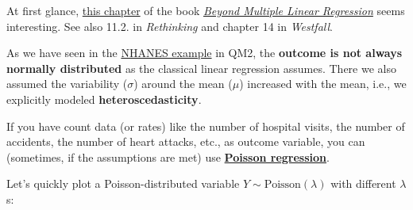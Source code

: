 \documentclass[
]{book}
\begin{document}
At first glance, \href{https://bookdown.org/roback/bookdown-BeyondMLR/ch-poissonreg.html}{this chapter}
of the book \href{https://bookdown.org/roback/bookdown-BeyondMLR/}{\emph{Beyond Multiple Linear Regression}} seems interesting.
See also 11.2. in \emph{Rethinking} and chapter 14 in \emph{Westfall}.

As we have seen in the \href{https://ec.europa.eu/info/funding-tenders/opportunities/portal/screen/opportunities/calls-for-proposals?isExactMatch=true&status=31094501,31094502,31094503&order=DESC&pageNumber=1&pageSize=50&sortBy=startDate}{NHANES example}
in QM2, the \textbf{outcome is not always normally distributed} as the classical linear regression
assumes. There we also assumed the variability (\(\sigma\)) around the mean (\(\mu\)) increased with the mean,
i.e., we explicitly modeled \textbf{heteroscedasticity}.

If you have count data (or rates) like the number of hospital visits,
the number of accidents, the number of heart attacks, etc., as outcome variable,
you can (sometimes, if the assumptions are met) use \href{https://en.wikipedia.org/wiki/Poisson_regression}{\textbf{Poisson regression}}.

Let's quickly plot a Poisson-distributed variable \(Y \sim \text{Poisson}(\lambda)\)
with different \(\lambda\)s:
\end{document}
